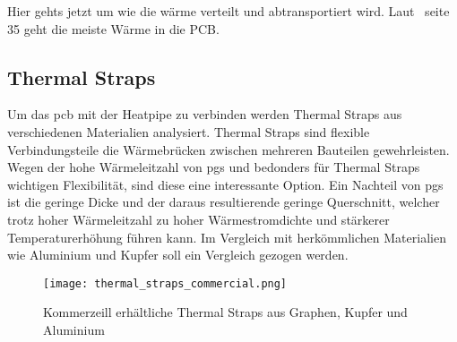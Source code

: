 Hier gehts jetzt um wie die wärme verteilt und abtransportiert wird. Laut~\cite{Xingcun-2011} seite 35 geht die meiste Wärme in die PCB.

\newpage

\subsection{Thermal Straps}\label{thermalstraps}

Um das \ac{pcb} mit der Heatpipe zu verbinden werden Thermal Straps aus verschiedenen Materialien analysiert.
Thermal Straps sind flexible Verbindungsteile die Wärmebrücken zwischen mehreren Bauteilen gewehrleisten.
Wegen der hohe Wärmeleitzahl von \ac{pgs} und bedonders für Thermal Straps wichtigen Flexibilität, sind diese eine interessante Option.
Ein Nachteil von \ac{pgs} ist die geringe Dicke und der daraus resultierende geringe Querschnitt, welcher trotz hoher Wärmeleitzahl zu hoher Wärmestromdichte und stärkerer Temperaturerhöhung führen kann.
Im Vergleich mit herkömmlichen Materialien wie Aluminium und Kupfer soll ein Vergleich gezogen werden.

\begin{figure}[H]
  \centering
  \texttt{[image: thermal\_straps\_commercial.png]}
  \caption{Kommerzeill erhältliche Thermal Straps aus Graphen, Kupfer und Aluminium~\cite{Thermal-Straps}}\label{fig:thermalstraps_commercial}
\end{figure}

\newpage

